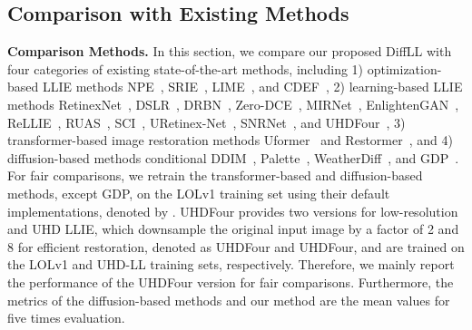 \subsection{Comparison with Existing Methods}\label{subsec:Comparison with Existing Methods}
\textbf{Comparison Methods.} In this section, we compare our proposed DiffLL with four categories of existing state-of-the-art methods, including 1) optimization-based LLIE methods NPE~\cite{NPE}, SRIE~\cite{SRIE}, LIME~\cite{LIME}, and CDEF~\cite{CDEF}, 2) learning-based LLIE methods RetinexNet~\cite{RetinexNet}, DSLR~\cite{DSLR}, DRBN~\cite{DRBN}, Zero-DCE~\cite{Zero-DCE}, MIRNet~\cite{MIRNet}, EnlightenGAN~\cite{EnlightenGAN}, ReLLIE~\cite{ReLLIE}, RUAS~\cite{RUAS},  SCI~\cite{SCI}, URetinex-Net~\cite{Uretinex-net}, SNRNet~\cite{SNRNet}, and UHDFour~\cite{UHD_ICLR}, 3) transformer-based image restoration methods Uformer~\cite{Uformer} and Restormer~\cite{Restormer}, and 4) diffusion-based methods conditional DDIM~\cite{ddim}, Palette~\cite{palette}, WeatherDiff~\cite{weatherdiff}, and GDP~\cite{GDP}. For fair comparisons, we retrain the transformer-based and diffusion-based methods, except GDP, on the LOLv1 training set using their default implementations, denoted by . UHDFour provides two versions for low-resolution and UHD LLIE, which downsample the original input image by a factor of 2 and 8 for efficient restoration, denoted as UHDFour and UHDFour, and are trained on the LOLv1 and UHD-LL training sets, respectively. Therefore, we mainly report the performance of the UHDFour version for fair comparisons. Furthermore, the metrics of the diffusion-based methods and our method are the mean values for five times evaluation.

